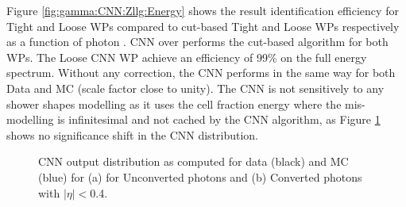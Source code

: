 Figure \ref{fig:gamma:CNN:Zllg:Energy} shows the result identification efficiency for Tight and Loose WPs compared to cut-based Tight and Loose WPs respectively as a function of photon \eT. CNN over performs the cut-based algorithm for both WPs. The Loose CNN WP achieve an efficiency of 99\% on the full energy spectrum. Without any correction, the CNN performs in the same way for both Data and MC (scale factor close to unity). The CNN is not sensitively to any shower shapes modelling as it uses the cell fraction energy where the mis-modelling is infinitesimal and not cached by the CNN algorithm, as Figure \ref{fig:gamma:CNN:Zllg:CNNOutput} shows no significance shift in the CNN distribution. 
\begin{figure}[H]
    \caption{CNN output distribution as computed for data (black) and MC (blue) for (a) for Unconverted photons and (b) Converted photons with $|\eta|<$0.4.}
    \label{fig:gamma:CNN:Zllg:CNNOutput}
\end{figure}

